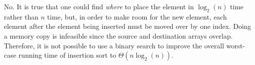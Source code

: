 No. It is true that one could find \textit{where} to place the element in $\log_2(n)$ time rather than $n$ time, but, in order to make room for the new element, each element after the element being inserted must be moved over by one index. Doing a memory copy is infeasible since the source and destination arrays overlap. Therefore, it is not possible to use a binary search to improve the overall worst-case running time of insertion sort to $\Theta(n \log_2(n))$.
